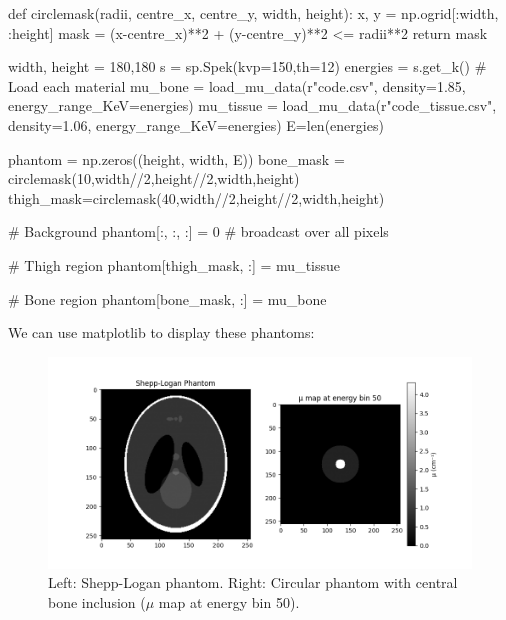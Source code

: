 \documentclass{article}
\begin{document}
\begin{python}
def circlemask(radii, centre_x, centre_y, width, height):
    x, y = np.ogrid[:width, :height]
    mask = (x-centre_x)**2 + (y-centre_y)**2 <= radii**2
    return mask
   
width, height = 180,180
s = sp.Spek(kvp=150,th=12)
energies = s.get_k()
# Load each material
mu_bone = load_mu_data(r"code\bone.csv", density=1.85, energy_range_KeV=energies)
mu_tissue = load_mu_data(r"code\soft_tissue.csv", density=1.06, energy_range_KeV=energies)
E=len(energies)

phantom = np.zeros((height, width, E))
bone_mask = circlemask(10,width//2,height//2,width,height)
thigh_mask=circlemask(40,width//2,height//2,width,height)

# Background
phantom[:, :, :] = 0  # broadcast over all pixels

# Thigh region
phantom[thigh_mask, :] = mu_tissue

# Bone region
phantom[bone_mask, :] = mu_bone
\end{python}

We can use matplotlib to display these phantoms:

\begin{figure}[H]
	\includegraphics[width=\linewidth]{simplephantom.png}
	\caption{Left: Shepp-Logan phantom. Right: Circular phantom with central bone inclusion ($\mu$ map at energy bin 50).}
	\label{fig:phantoms}
\end{figure}



\end{document}
